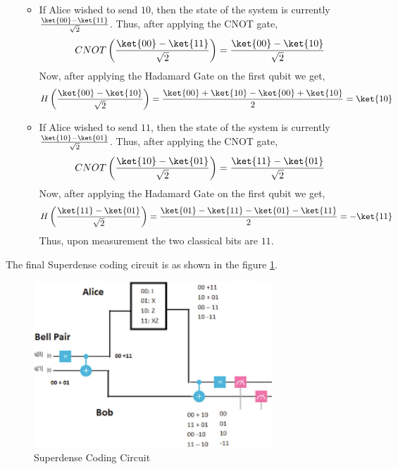 \documentclass[12pt, oneside]{book}
\theoremstyle{definition}
\theoremstyle{definition}
\theoremstyle{remark}
\begin{document}
\begin{enumerate}
\begin{itemize}
\[        \]
        \item If Alice wished to send $10$, then the state of the system is currently $\frac{\ket{00}-\ket{11}}{\sqrt{2}}$. Thus, after applying the CNOT gate,
        \[
            CNOT\left(\frac{\ket{00}-\ket{11}}{\sqrt{2}}\right)=\frac{\ket{00}-\ket{10}}{\sqrt{2}}
        \]
        Now, after applying the Hadamard Gate on the first qubit we get,
        \[
            H\left(\frac{\ket{00}-\ket{10}}{\sqrt{2}}\right)=\frac{\ket{00}+\ket{10}-\ket{00}+\ket{10}}{2}=\ket{10}
        \]
        \item If Alice wished to send $11$, then the state of the system is currently $\frac{\ket{10}-\ket{01}}{\sqrt{2}}$. Thus, after applying the CNOT gate,
        \[
            CNOT\left(\frac{\ket{10}-\ket{01}}{\sqrt{2}}\right)=\frac{\ket{11}-\ket{01}}{\sqrt{2}}
        \]
        Now, after applying the Hadamard Gate on the first qubit we get,
        \[
            H\left(\frac{\ket{11}-\ket{01}}{\sqrt{2}}\right)=\frac{\ket{01}-\ket{11}-\ket{01}-\ket{11}}{2}=-\ket{11}
        \]
        Thus, upon measurement the two classical bits are $11$.
    \end{itemize}
\end{enumerate}

The final Superdense coding circuit is as shown in the figure \ref{fig:superdense-coding}.
\begin{figure}[H]
    \centering
    \includegraphics[width=0.8\textwidth]{../images/superdense-coding4.png}
    \caption{Superdense Coding Circuit}
    \label{fig:superdense-coding}
\end{figure}
 
\newpage
\end{document}

